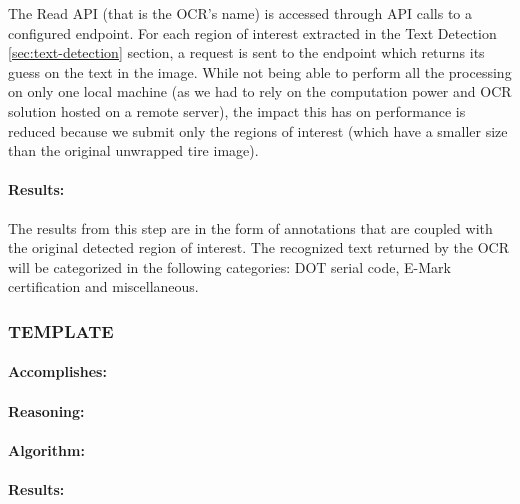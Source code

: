 The Read API (that is the OCR's name) \cite{site:Microsoft_Cognitive_Services-Read_API-OCR} is accessed through API calls to a configured endpoint. For each region of interest extracted in the Text Detection \ref{sec:text-detection} section, a request is sent to the endpoint which returns its guess on the text in the image. While not being able to perform all the processing on only one local machine (as we had to rely on the computation power and OCR solution hosted on a remote server), the impact this has on performance is reduced because we submit only the regions of interest (which have a smaller size than the original unwrapped tire image).

\paragraph*{Results:}\mbox{}\par
The results from this step are in the form of annotations that are coupled with the original detected region of interest. The recognized text returned by the OCR will be categorized in the following categories: DOT serial code, E-Mark certification and miscellaneous.


\subsubsection{TEMPLATE}
\label{subsubsec:TEMPLATE}

\paragraph*{Accomplishes:}\mbox{}\par

\paragraph*{Reasoning:}\mbox{}\par

\paragraph*{Algorithm:}\mbox{}\par

\paragraph*{Results:}\mbox{}\par

